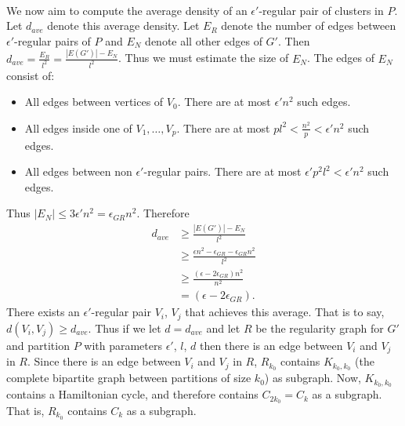 \documentclass[letterpaper,12pt,oneside,onecolumn]{article}
\begin{document}
\paragraph{}
We now aim to compute the average density of an $\epsilon'$-regular pair of clusters in $P$. Let $d_{ave}$ denote this average density. Let $E_R$ denote the number of edges between $\epsilon'$-regular pairs of $P$ and $E_N$ denote all other edges of $G'$. Then $d_{ave} = \frac{E_R}{l^2} = \frac{|E(G')| - E_N}{l^2}$. Thus we must estimate the size of $E_N$. The edges of $E_N$ consist of:
\begin{itemize}
\item All edges between vertices of $V_0$. There are at most $\epsilon'n^2$ such edges.\\
\item All edges inside one of $V_1, \dots, V_p$. There are at most $pl^2 < \frac{n^2}{p} < \epsilon'n^2$ such edges.\\
\item All edges between non $\epsilon'$-regular pairs. There are at most $\epsilon'p^2l^2 < \epsilon' n^2$ such edges. \\
\end{itemize}
Thus $|E_N| \leq 3\epsilon'n^2 = \epsilon_{GR}n^2$. Therefore \begin{align*}d_{ave} &\geq \frac{|E(G')| - E_N}{l^2} \\&\geq \frac{\epsilon n^2 -\epsilon_{GR}- \epsilon_{GR}n^2}{l^2} \\&\geq \frac{(\epsilon - 2\epsilon_{GR})n^2}{n^2} \\&= (\epsilon - 2\epsilon_{GR}).\end{align*}
There exists an $\epsilon'$-regular pair $V_i$, $V_j$ that achieves this average. That is to say, $d(V_i,V_j) \geq d_{ave}$. Thus if we let $d = d_{ave}$ and let $R$ be the regularity graph for $G'$ and partition $P$ with parameters $\epsilon'$, $l$, $d$ then there is an edge between $V_i$ and $V_j$ in $R$. Since there is an edge between $V_i$ and $V_j$ in $R$, $R_{k_0}$ contains $K_{k_0,k_0}$ (the complete bipartite graph between partitions of size $k_0$) as subgraph. Now, $K_{k_0,k_0}$ contains a Hamiltonian cycle, and therefore contains $C_{2k_0} = C_{k}$ as a subgraph. That is, $R_{k_0}$ contains $C_k$ as a subgraph.
\end{document}
